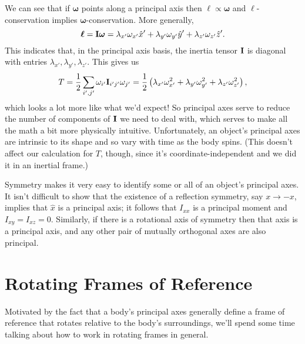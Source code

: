\documentclass[../p111main.tex]{subfiles}
\begin{document}
We can see that if $\bm \omega$ points along a principal axis then $\bm \ell \propto \bm \omega$ and $\bm \ell$-conservation implies $\bm \omega$-conservation.
More generally,
\[ \bm \ell = \mathbf{I} \bm \omega = \lambda_{x'} \omega_{x'} \hat x' + \lambda_{y'} \omega_{y'} \hat y' + \lambda_{z'} \omega_{z'} \hat z'. \]
This indicates that, in the principal axis basis, the inertia tensor $\mathbf{I}$ is diagonal with entries $\lambda_{x'}, \lambda_{y'}, \lambda_{z'}$.
This gives us
\[ T = \frac{1}{2} \sum_{i',j'}^{} \omega_{i'} \mathbf{I}_{i'j'} \omega_{j'} = \frac{1}{2} \left( \lambda_{x'} \omega_{x'}^2 + \lambda_{y'} \omega_{y'}^2 + \lambda_{z'} \omega_{z'}^2 \right), \]
which looks a lot more like what we'd expect!
So principal axes serve to reduce the number of components of $\mathbf{I}$ we need to deal with, which serves to make all the math a bit more physically intuitive.
Unfortunately, an object's principal axes are intrinsic to its shape and so vary with time as the body spins.
(This doesn't affect our calculation for $T$, though, since it's coordinate-independent and we did it in an inertial frame.)

Symmetry makes it very easy to identify some or all of an object's principal axes.
It isn't difficult to show that the existence of a reflection symmetry, say $x \to -x$, implies that $\hat x$ is a principal axis; it follows that $I_{xx}$ is a principal moment and $I_{xy} = I_{xz} = 0$.
Similarly, if there is a rotational axis of symmetry then that axis is a principal axis, and any other pair of mutually orthogonal axes are also principal.

\section{Rotating Frames of Reference}
Motivated by the fact that a body's principal axes generally define a frame of reference that rotates relative to the body's surroundings, we'll spend some time talking about how to work in rotating frames in general.
\end{document}
